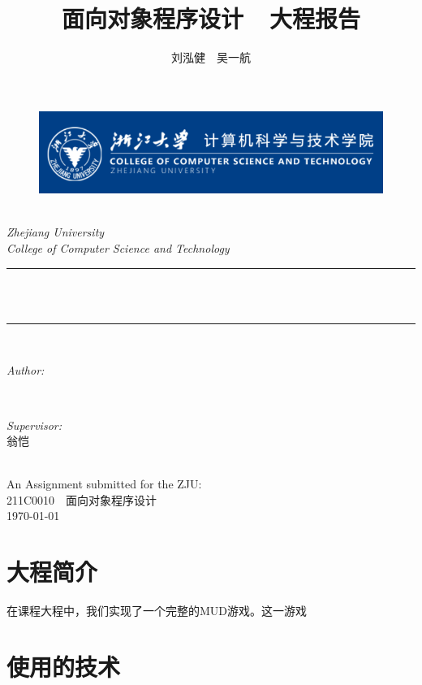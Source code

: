 \documentclass[UTF8]{ctexart}
\title{\heiti 面向对象程序设计\ \ 大程报告}
\author{\Large \kaishu \textup{刘泓健\ \ 吴一航}}
\begin{document}
\begin{titlepage}
	\newcommand{\HRule}{\rule{\linewidth}{0.5mm}}
	\begin{figure}
        \flushleft
        \includegraphics[scale=0.4]{0.png}
    \end{figure}
    \center 
	\quad\\[1.5cm]
	\textsl{\Large Zhejiang University }\\[0.5cm] 
	\textsl{\large College of Computer Science and Technology}\\[0.5cm] 
	\makeatletter
	\HRule \\[0.4cm]
	{ \huge \bfseries \@title}\\[0.4cm] 
	\HRule \\[1.5cm]
	\begin{minipage}{0.4\textwidth}
		\begin{flushleft} \Large
			\emph{Author:}\\
			\@author 
		\end{flushleft}
	\end{minipage}
	~
	\begin{minipage}{0.4\textwidth}
		\begin{flushright} \Large \kaishu
			\emph{Supervisor:} \\
			\textup{翁恺}
		\end{flushright}
	\end{minipage}\\[3cm]
	\makeatother
	{\large An Assignment submitted for the ZJU:}\\[0.5cm]
	{\large {211C0010\ \ 面向对象程序设计}}\\[0.5cm]
	{\large \today}\\[2cm] 
	\vfill 
\end{titlepage}
    
    \section{大程简介}
    在课程大程中，我们实现了一个完整的MUD游戏。这一游戏

    \section{使用的技术}
    
\end{document}
